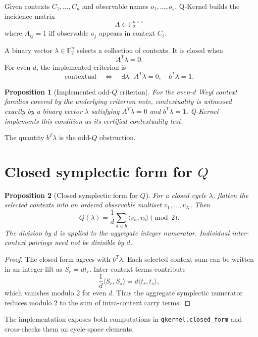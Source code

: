 \documentclass[11pt]{article}
\newtheorem{proposition}{Proposition}
\begin{document}
Given contexts \(C_1,\ldots,C_n\) and observable names \(o_1,\ldots,o_s\), Q-Kernel builds the incidence matrix
\[
  A \in \mathbb{F}_2^{n\times s}
\]
where \(A_{ij}=1\) iff observable \(o_j\) appears in context \(C_i\).

A binary vector \(\lambda\in\mathbb{F}_2^n\) selects a collection of contexts.  It is closed when
\[
  A^T\lambda=0.
\]
For even \(d\), the implemented criterion is
\[
  \text{contextual} \quad\Longleftrightarrow\quad
  \exists\lambda:\ A^T\lambda=0,\quad b^T\lambda=1.
\]
\begin{proposition}[Implemented odd-\(Q\) criterion]
\label{prop:odd-q-criterion}
For the even-\(d\) Weyl context families covered by the underlying criterion note, contextuality is witnessed exactly by a binary vector \(\lambda\) satisfying \(A^T\lambda=0\) and \(b^T\lambda=1\).  Q-Kernel implements this condition as its certified contextuality test.
\end{proposition}

The quantity \(b^T\lambda\) is the odd-\(Q\) obstruction.

\section{Closed symplectic form for \(Q\)}

\begin{proposition}[Closed symplectic form for \(Q\)]
\label{prop:closed-q-form}
For a closed cycle \(\lambda\), flatten the selected contexts into an ordered observable multiset \(v_1,\ldots,v_N\).  Then
\[
  Q(\lambda)
  =
  \frac{1}{d}
  \sum_{a<b}
  \langle v_a,v_b\rangle
  \pmod 2.
\]
The division by \(d\) is applied to the aggregate integer numerator.  Individual inter-context pairings need not be divisible by \(d\).
\end{proposition}

\begin{proof}
The closed form agrees with \(b^T\lambda\).  Each selected context sum can be written in an integer lift as \(S_r=d t_r\).  Inter-context terms contribute
\[
  \frac{1}{d}\langle S_r,S_s\rangle
  =
  d\langle t_r,t_s\rangle,
\]
which vanishes modulo \(2\) for even \(d\).  Thus the aggregate symplectic numerator reduces modulo \(2\) to the sum of intra-context carry terms.
\end{proof}

The implementation exposes both computations in \texttt{qkernel.closed\_form} and cross-checks them on cycle-space elements.
\end{document}
